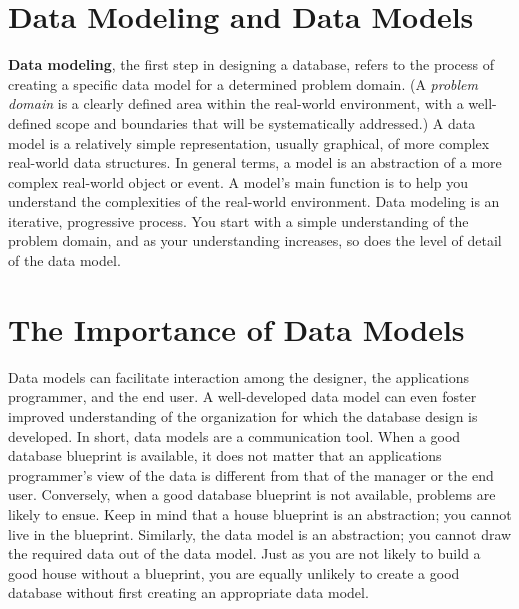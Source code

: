\documentclass[a4paper, 12pt, titlepage]{report}
\begin{document}
\section{Data Modeling and Data Models}
\textbf{Data modeling}, the first step in designing a database, refers to the process of creating a specific data model for a determined problem domain. (A \emph{problem domain} is a clearly defined area within the real-world environment, with a well-defined scope and boundaries that will be systematically addressed.) A data model is a relatively
simple representation, usually graphical, of more complex real-world data structures. In general terms, a model is an abstraction of a more complex real-world object or event. A
model’s main function is to help you understand the complexities of the real-world environment. Data modeling is an iterative, progressive process. You start with a simple understanding of the problem domain, and as your understanding increases, so does the level of detail of the data model.
\section{The Importance of Data Models}
Data models can facilitate interaction among the designer, the applications programmer, and the end user. A well-developed data model can even foster improved understanding of the organization for which the database design is developed. In short, data models are a communication tool. When a good database blueprint is available, it does not matter that an applications programmer’s view of the data is different from that of the manager or the end user. Conversely, when a good database blueprint is not available, problems are likely to ensue. Keep in mind that a house blueprint is an abstraction; you cannot live in the blueprint. Similarly, the data model is an abstraction; you cannot draw the required data out of the data model. Just as you are not likely to build a good house without a blueprint, you are equally unlikely to create a good database without first creating an appropriate data model.
\end{document}
